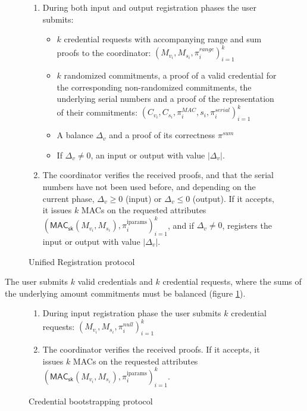 \documentclass{article}
\begin{document}
\begin{figure}[h!]
    \begin{mdframed}
    \begin{enumerate}
        \item During both input and output registration phases the user submits:
        \begin{itemize}
            \item $k$ credential requests with accompanying range and sum proofs to the coordinator:  $(M_{v_i},M_{s_i},\pi^{\textit{range}}_{i})^{k}_{i=1}$
            \item $k$ randomized commitments, a proof of a valid credential for the corresponding non-randomized commitments, the underlying serial numbers and a proof of the representation of their commitments: $(C_{v_i},C_{s_i},\pi_{i}^{\mathit{MAC}},s_i,\pi_i^{\textit{serial}})^{k}_{i=1}$
            \item A balance $\Delta_{v}$ and a proof of its correctness $\pi^{\textit{sum}}$
            \item If $\Delta_{v} \ne 0$, an input or output with value $|\Delta_{v}|$.
        \end{itemize}
        \item The coordinator verifies the received proofs, and that the serial numbers have not been used before, and depending on the current phase, $\Delta_{v} \geq 0$ (input) or $\Delta_{v} \leq 0$ (output). If it accepts, it issues $k$ MACs on the requested attributes $(\mathsf{MAC}_\mathsf{sk}(M_{v_i},M_{s_i}), \pi_i^{\mathrm{iparams}})^{k}_{i=1}$, and if $\Delta_{v} \ne 0$, registers the input or output with value $|\Delta_{v}|$.
    \end{enumerate}
    \end{mdframed}
    \caption{Unified Registration protocol}
    \label{fig:reissue}
\end{figure}

The user submits $k$ valid credentials and $k$ credential requests, where the sums of the underlying amount commitments must be balanced (figure \ref{fig:reissue}).

\begin{figure}[h!]
  \begin{mdframed}
    \begin{enumerate}
    \item During input registration phase the user submits $k$ credential requests:  $(M_{v_i},M_{s_i},\pi^{\mathit{null}}_{i})^{k}_{i=1}$
    \item The coordinator verifies the received proofs. If it accepts, it issues $k$ MACs on the requested attributes $(\mathsf{MAC}_\mathsf{sk}(M_{v_i},M_{s_i}), \pi_i^{\mathrm{iparams}})^{k}_{i=1}$.
    \end{enumerate}
  \end{mdframed}
  \caption{Credential bootstrapping protocol}
  \label{fig:bootstrap}
\end{figure}
\end{document}
